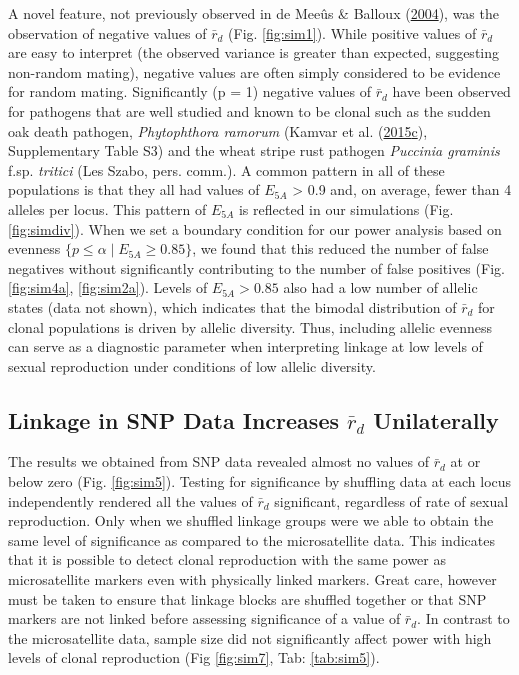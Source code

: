 \documentclass[double,11pt]{beavtex}
\begin{document}
  A novel feature, not previously observed in de Meeûs \& Balloux
  (\protect\hyperlink{ref-de2004clonal}{2004}), was the observation of
  negative values of \(\bar{r}_d\) (Fig. \ref{fig:sim1}). While positive
  values of \(\bar{r}_d\) are easy to interpret (the observed variance is
  greater than expected, suggesting non-random mating), negative values
  are often simply considered to be evidence for random mating.
  Significantly (p = 1) negative values of \(\bar{r}_d\) have been
  observed for pathogens that are well studied and known to be clonal such
  as the sudden oak death pathogen, \emph{Phytophthora ramorum} (Kamvar et
  al.
  (\protect\hyperlink{ref-kamvar2015spatial}{2015}\protect\hyperlink{ref-kamvar2015spatial}{c}),
  Supplementary Table S3) and the wheat stripe rust pathogen
  \emph{Puccinia graminis} f.sp. \emph{tritici} (Les Szabo, pers. comm.).
  A common pattern in all of these populations is that they all had values
  of \(E_{5A}\) \textgreater{} 0.9 and, on average, fewer than 4 alleles
  per locus. This pattern of \(E_{5A}\) is reflected in our simulations
  (Fig. \ref{fig:simdiv}). When we set a boundary condition for our power
  analysis based on evenness \(\{p \leq \alpha \mid E_{5A} \geq 0.85\}\),
  we found that this reduced the number of false negatives without
  significantly contributing to the number of false positives (Fig.
  \ref{fig:sim4a}, \ref{fig:sim2a}). Levels of \(E_{5A} > 0.85\) also had
  a low number of allelic states (data not shown), which indicates that
  the bimodal distribution of \(\bar{r}_d\) for clonal populations is
  driven by allelic diversity. Thus, including allelic evenness can serve
  as a diagnostic parameter when interpreting linkage at low levels of
  sexual reproduction under conditions of low allelic diversity.
  
  \newpage
  
  \subsection{\texorpdfstring{Linkage in SNP Data Increases \(\bar{r}_d\)
  Unilaterally}{Linkage in SNP Data Increases \textbackslash{}bar\{r\}\_d Unilaterally}}\label{linkage-in-snp-data-increases-barr_d-unilaterally}
  
  The results we obtained from SNP data revealed almost no values of
  \(\bar{r}_d\) at or below zero (Fig. \ref{fig:sim5}). Testing for
  significance by shuffling data at each locus independently rendered all
  the values of \(\bar{r}_d\) significant, regardless of rate of sexual
  reproduction. Only when we shuffled linkage groups were we able to
  obtain the same level of significance as compared to the microsatellite
  data. This indicates that it is possible to detect clonal reproduction
  with the same power as microsatellite markers even with physically
  linked markers. Great care, however must be taken to ensure that linkage
  blocks are shuffled together or that SNP markers are not linked before
  assessing significance of a value of \(\bar{r}_d\). In contrast to the
  microsatellite data, sample size did not significantly affect power with
  high levels of clonal reproduction (Fig \ref{fig:sim7}, Tab:
  \ref{tab:sim5}).
  
\end{document}

